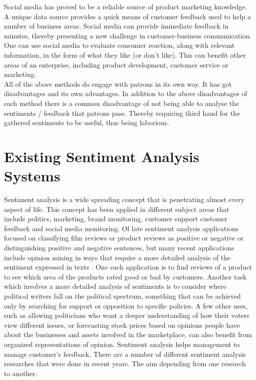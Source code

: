 \documentclass[12pt]{report}
\begin{document}
	Social media has proved to be a reliable source of product marketing knowledge. A unique data source provides a quick means of customer feedback used to help a number of business areas. Social media can provide immediate feedback in minutes, thereby presenting a new challenge in customer-business communication. One can use social media to evaluate consumer reaction, along with relevant information, in the form of what they like (or don't like). This can benefit other areas of an enterprise, including product development, customer service or marketing.\\
	
	All of the above methods do engage with patrons in its own way. It has got disadvantages and its own advantages. In addition to the above disadvantages of each method there is a common disadvantage of not being able to analyse the sentiments / feedback that patrons pass. Thereby requiring third hand for the gathered sentiments to be useful, thus being laborious.
		
	\section{Existing Sentiment Analysis Systems}
	Sentiment analysis is a wide spreading concept that is penetrating almost every aspect of life. This concept has been applied in different subject areas that include politics, marketing, brand monitoring, customer support customer feedback and social media monitoring. Of late sentiment analysis applications focused on classifying film reviews or product reviews as positive or negative or distinguishing positive and negative sentences, but many recent applications include opinion mining in ways that require a more detailed analysis of the sentiment expressed in texts \cite{jandail2014proposed}. One such application is to find reviews of a product to see which area of the products rated good or bad by customers. Another task which involves a more detailed analysis of sentiments is to consider where political writers fall on the political spectrum, something that can be achieved only by searching for support or opposition to specific policies. A few other uses, such as allowing politicians who want a deeper understanding of how their voters view different issues, or forecasting stock prices based on opinions people have about the businesses and assets involved in the marketplace, can also benefit from organized representations of opinion. Sentiment analysis helps management to manage customer's feedback. There are a number of different sentiment analysis researches that were done in recent years. The aim depending from one research to another.\\
	
\end{document}
